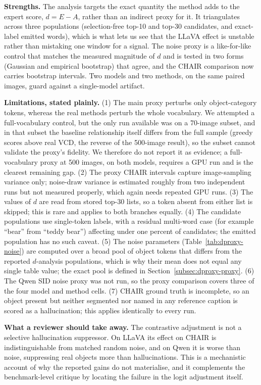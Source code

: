 \textbf{Strengths.} The analysis targets the exact quantity the method adds to the
expert score, $d = E - A$, rather than an indirect proxy for it. It triangulates
across three populations (selection-free top-10 and top-30 candidates, and
exact-label emitted words), which is what lets us see that the LLaVA effect is
unstable rather than mistaking one window for a signal. The noise proxy is a
like-for-like control that matches the measured magnitude of $d$ and is tested in
two forms (Gaussian and empirical bootstrap) that agree, and the CHAIR comparison
now carries bootstrap intervals. Two models and two methods, on the same paired
images, guard against a single-model artifact.

\textbf{Limitations, stated plainly.} (1) The main proxy perturbs only
object-category tokens, whereas the real methods perturb the whole vocabulary. We
attempted a full-vocabulary control, but the only run available was on a 70-image
subset, and in that subset the baseline relationship itself differs from the full
sample (greedy scores above real VCD, the reverse of the 500-image result), so
the subset cannot validate the proxy's fidelity. We therefore do not report it as
evidence; a full-vocabulary proxy at 500 images, on both models, requires a GPU
run and is the clearest remaining gap. (2) The proxy CHAIR intervals capture
image-sampling variance only; noise-draw variance is estimated roughly from two
independent runs but not measured properly, which again needs repeated GPU runs.
(3) The values of $d$ are read from stored top-30 lists, so a token absent from
either list is skipped; this is rare and applies to both branches equally. (4)
The candidate populations use single-token labels, with a residual multi-word
case (for example ``bear'' from ``teddy bear'') affecting under one percent of
candidates; the emitted population has no such caveat. (5) The noise parameters
(Table~\ref{tab:dproxy-noise}) are computed over a broad pool of object tokens
that differs from the reported $d$-analysis populations, which is why their mean
does not equal any single table value; the exact pool is defined in
Section~\ref{subsec:dproxy-proxy}. (6) The Qwen SID noise proxy was not run, so
the proxy comparison covers three of the four model and method cells. (7) CHAIR
ground truth is incomplete, so an object present but neither segmented nor named
in any reference caption is scored as a hallucination; this applies identically
to every run.

\textbf{What a reviewer should take away.} The contrastive adjustment is not a
selective hallucination suppressor. On LLaVA its effect on CHAIR is
indistinguishable from matched random noise, and on Qwen it is worse than noise,
suppressing real objects more than hallucinations. This is a mechanistic account
of why the reported gains do not materialise, and it complements the
benchmark-level critique by locating the failure in the logit adjustment itself.
